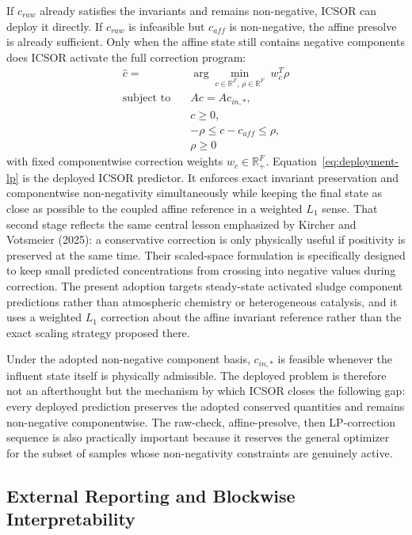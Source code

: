 \documentclass[a4paper,fleqn]{cas-sc}
\newenvironment{revblock}{\begingroup\color{revDefault}}{\endgroup}
\begin{document}
\begin{revblock}
If $c_{raw}$ already satisfies the invariants and remains non-negative, ICSOR can deploy it directly. If $c_{raw}$ is infeasible but $c_{aff}$ is non-negative, the affine presolve is already sufficient. Only when the affine state still contains negative components does ICSOR activate the full correction program:
\begin{equation}
\label{eq:deployment-lp}
\begin{aligned}
\hat{c} = {}& \arg\min_{c \in \mathbb{R}^{F},\, \rho \in \mathbb{R}^{F}} \; w_c^T \rho \\
\text{subject to} \quad {}& A c = A c_{in,*}, \\
& c \ge 0, \\
& -\rho \le c - c_{aff} \le \rho, \\
& \rho \ge 0
\end{aligned}
\end{equation}
with fixed componentwise correction weights $w_c \in \mathbb{R}_{+}^{F}$. Equation~\eqref{eq:deployment-lp} is the deployed ICSOR predictor. It enforces exact invariant preservation and componentwise non-negativity simultaneously while keeping the final state as close as possible to the coupled affine reference in a weighted $L_1$ sense.
That second stage reflects the same central lesson emphasized by Kircher and Votsmeier (2025): a conservative correction is only physically useful if positivity is preserved at the same time. Their scaled-space formulation is specifically designed to keep small predicted concentrations from crossing into negative values during correction. The present adoption targets steady-state activated sludge component predictions rather than atmospheric chemistry or heterogeneous catalysis, and it uses a weighted $L_1$ correction about the affine invariant reference rather than the exact scaling strategy proposed there.

Under the adopted non-negative component basis, $c_{in,*}$ is feasible whenever the influent state itself is physically admissible. The deployed problem is therefore not an afterthought but the mechanism by which ICSOR closes the following gap: every deployed prediction preserves the adopted conserved quantities and remains non-negative componentwise. The raw-check, affine-presolve, then LP-correction sequence is also practically important because it reserves the general optimizer for the subset of samples whose non-negativity constraints are genuinely active.

\subsection{External Reporting and Blockwise Interpretability}


\end{revblock}
\end{document}
